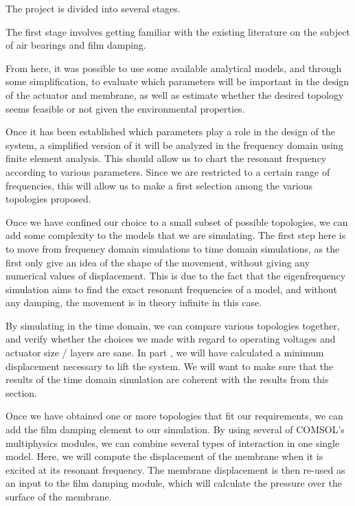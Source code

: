 The project is divided into several stages.

The first stage involves getting familiar with the existing literature on the
subject of air bearings and film damping.

From here, it was possible to use some available analytical models, and through
some simplification, to evaluate which parameters will be important in the
design of the actuator and membrane, as well as estimate whether the desired
topology seems feasible or not given the environmental properties.


Once it has been established which parameters play a role in the design of the
system, a simplified version of it will be analyzed in the frequency domain
using finite element analysis. This should allow us to chart the resonant
frequency according to various parameters. Since we are restricted to a certain
range of frequencies, this will allow us to make a first selection among the
various topologies proposed.

Once we have confined our choice to a small subset of possible topologies, we
can add some complexity to the models that we are simulating. The first step
here is to move from frequency domain simulations to time domain simulations, as
the first only give an idea of the shape of the movement, without giving any
numerical values of displacement. This is due to the fact that the
eigenfrequency simulation aims to find the exact resonant frequencies of a
model, and without any damping, the movement is in theory infinite in this case.

By simulating in the time domain, we can compare various topologies together,
and verify whether the choices we made with regard to operating voltages and
actuator size / layers are sane. In part %
, we will have calculated a minimum displacement necessary to lift the system.
We will want to make sure that the results of the time domain simulation are
coherent with the results from this section.

Once we have obtained one or more topologies that fit our requirements, we can
add the film damping element to our simulation. By using several of COMSOL's
multiphysics modules, we can combine several types of interaction in one single
model. Here, we will compute the displacement of the membrane when it is excited
at its resonant frequency. The membrane displacement is then re-used as an input
to the film damping module, which will calculate the pressure over the surface
of the membrane.


